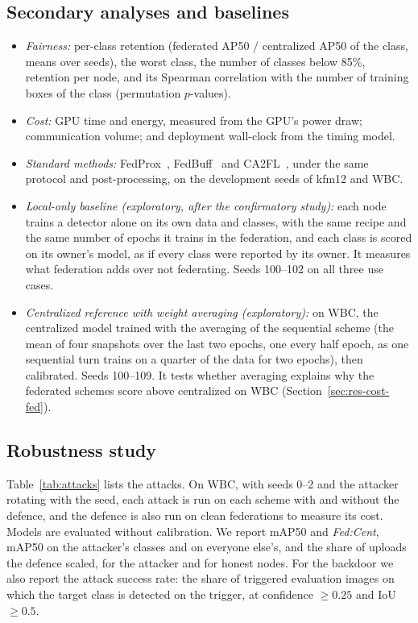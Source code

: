 \documentclass[pdflatex,sn-mathphys-num]{sn-jnl}
\newcommand{\fedcent}{\textit{Fed:Cent}}
\begin{document}
\subsection{Secondary analyses and baselines}\label{sec:secondary}
\begin{itemize}
\item \emph{Fairness:} per-class retention (federated AP50 / centralized AP50 of the class, means over seeds), the worst class, the number of classes below 85\%, retention per node, and its Spearman correlation with the number of training boxes of the class (permutation $p$-values).
\item \emph{Cost:} GPU time and energy, measured from the GPU's power draw; communication volume; and deployment wall-clock from the timing model.
\item \emph{Standard methods:} FedProx~\cite{li2020fedprox}, FedBuff~\cite{nguyen2022fedbuff} and CA2FL~\cite{wang2024ca2fl}, under the same protocol and post-processing, on the development seeds of kfm12 and WBC.
\item \emph{Local-only baseline (exploratory, after the confirmatory study):} each node trains a detector alone on its own data and classes, with the same recipe and the same number of epochs it trains in the federation, and each class is scored on its owner's model, as if every class were reported by its owner. It measures what federation adds over not federating. Seeds 100--102 on all three use cases.
\item \emph{Centralized reference with weight averaging (exploratory):} on WBC, the centralized model trained with the averaging of the sequential scheme (the mean of four snapshots over the last two epochs, one every half epoch, as one sequential turn trains on a quarter of the data for two epochs), then calibrated. Seeds 100--109. It tests whether averaging explains why the federated schemes score above centralized on WBC (Section~\ref{sec:res-cost-fed}).
\end{itemize}

\subsection{Robustness study}\label{sec:robust-method}
Table~\ref{tab:attacks} lists the attacks. On WBC, with seeds 0--2 and the attacker rotating with the seed, each attack is run on each scheme with and without the defence, and the defence is also run on clean federations to measure its cost. Models are evaluated without calibration. We report mAP50 and \fedcent{}, mAP50 on the attacker's classes and on everyone else's, and the share of uploads the defence scaled, for the attacker and for honest nodes. For the backdoor we also report the attack success rate: the share of triggered evaluation images on which the target class is detected on the trigger, at confidence $\ge0.25$ and IoU $\ge0.5$.
\end{document}
